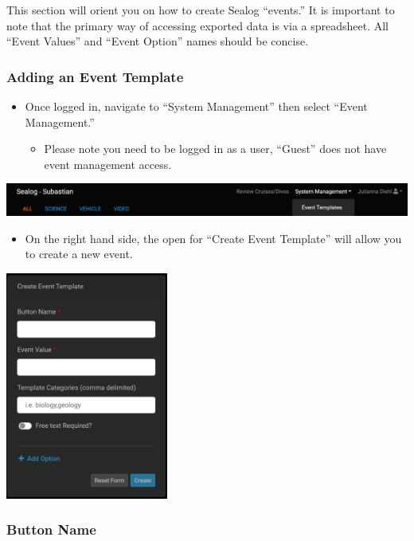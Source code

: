 \documentclass[
  letterpaper,
  DIV=11,
  numbers=noendperiod]{scrreprt}
\providecommand{\tightlist}{%
  \setlength{\itemsep}{0pt}\setlength{\parskip}{0pt}}\usepackage{longtable,booktabs,array}
\begin{document}
This section will orient you on how to create Sealog ``events.'' It is
important to note that the primary way of accessing exported data is via
a spreadsheet. All ``Event Values'' and ``Event Option'' names should be
concise.

\hypertarget{adding-an-event-template}{%
\subsubsection{Adding an Event
Template}\label{adding-an-event-template}}

\begin{itemize}
\tightlist
\item
  Once logged in, navigate to ``System Management'' then select ``Event
  Management.''

  \begin{itemize}
  \tightlist
  \item
    Please note you need to be logged in as a user, ``Guest'' does not
    have event management access.
  \end{itemize}
\end{itemize}

\includegraphics{images/image21.png}

\begin{itemize}
\tightlist
\item
  On the right hand side, the open for ``Create Event Template'' will
  allow you to create a new event.
\end{itemize}

\includegraphics[width=0.4\textwidth,height=\textheight]{images/image9.png}

\hypertarget{button-name}{%
\subsubsection{Button Name}\label{button-name}}
\end{document}
